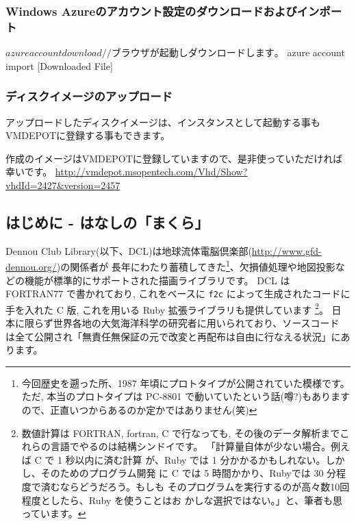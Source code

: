 \documentclass[mingoth,a4paper,twoside]{jsarticle}
\begin{document}
\subsubsection{Windows Azureのアカウント設定のダウンロードおよびインポート}
\begin{commandline}
$ azure account download // ブラウザが起動しダウンロードします。
$ azure account import [Downloaded File]
\end{commandline}

\subsubsection{ディスクイメージのアップロード}

アップロードしたディスクイメージは、インスタンスとして起動する事もVMDEPOTに登録する事もできます。

作成のイメージはVMDEPOTに登録していますので、是非使っていただければ幸いです。
\url{http://vmdepot.msopentech.com/Vhd/Show?vhdId=2427&version=2457}

\pagebreak
\label{sec:uwabami}

\subsection{はじめに - はなしの「まくら」}

Dennou Club Library(以下、DCL)は地球流体電脳倶楽部(\url{http://www.gfd-dennou.org/})の関係者が
長年にわたり蓄積してきた\footnote{%
  今回歴史を遡った所、1987 年頃にプロトタイプが公開されていた模様です。%
  ただ, 本当のプロトタイプは PC-8801 で動いていたという話(噂?)もありますので、正直いつからあるのか定かではありません(笑)%
}、欠損値処理や地図投影などの機能が標準的にサポートされた描画ライブラリです。
%
DCL は FORTRAN77 で書かれており,
これをベースに \texttt{f2c} によって生成されたコードに手を入れた C 版,  これを用いる Ruby 拡張ライブラリも提供しています
\footnote{%
  数値計算は FORTRAN, fortran, C で行なっても, その後のデータ解析までこれらの言語でやるのは結構シンドイです。
  「計算量自体が少ない場合。例えば C で 1 秒以内に済む計算
  が、Ruby では 1 分かかるかもしれない。しかし、そのためのプログラム開発
  に C では 5 時間かかり、Rubyでは 30 分程度で済むならどうだろう。もしも
  そのプログラムを実行するのが高々数10回程度としたら、Ruby を使うことはお
  かしな選択ではない\cite{RubiMa6}。」と、筆者も思っています。
}。
%
日本に限らず世界各地の大気海洋科学の研究者に用いられており、ソースコード
は全て公開され「無責任無保証の元で改変と再配布は自由に行なえる状況」にあ
ります。
\end{document}
